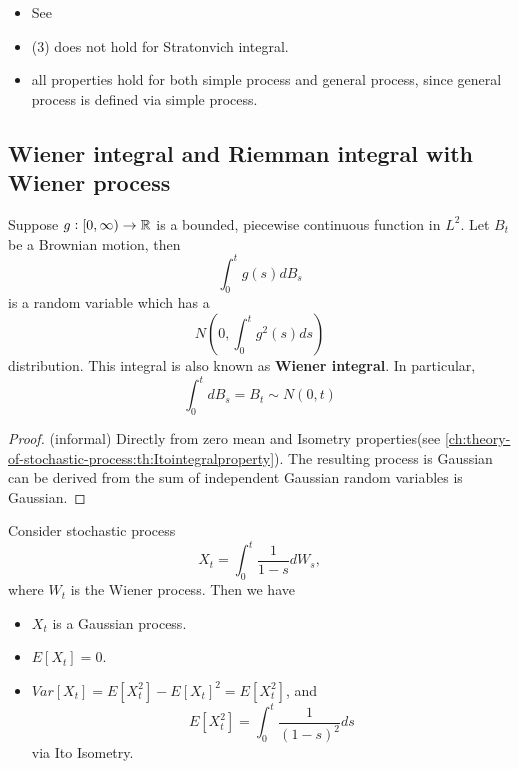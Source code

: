 \begin{refsection}
\begin{theorem}
\begin{enumerate}
	\end{enumerate}
\end{theorem}

\begin{remark}\hfill
	\begin{itemize}
		\item See \cite{Holmes-Cerfon2015applied}\cite{mikosch1998elementary}
		\item (3) does not hold for Stratonvich integral.  
		\item all properties hold for both simple process and general process, since general process is defined via simple process.
	\end{itemize}
\end{remark}




\subsection{Wiener integral and Riemman integral with Wiener process}


\begin{lemma}\cite[112]{calin2012introduction}\label{ch:theory-of-stochastic-process:th:wienerintegral}
	Suppose $g:[0,\infty) \to \mathbb{R}$ is a bounded, piecewise continuous function in $L^2$. Let $B_t$ be a Brownian motion, then
	$$\int_0^t g(s)dB_s$$
	is a random variable which has a 
	$$N(0,\int_0^t g^2(s)ds)$$ 
	distribution. This integral is also known as \textbf{Wiener integral}.
	In particular, 
	$$\int_0^t dB_s = B_t\sim N(0,t) $$
\end{lemma}
\begin{proof}
	(informal)	Directly from zero mean and Isometry properties(see \autoref{ch:theory-of-stochastic-process:th:Itointegralproperty}). The resulting process is Gaussian can be derived from the sum of independent Gaussian random variables is Gaussian.
\end{proof}

\begin{example}
	Consider stochastic process $$X_t = \int_0^t \frac{1}{1-s}dW_s,$$
	where $W_t$ is the Wiener process.
	Then we have
	\begin{itemize}
		\item $X_t$ is a Gaussian process.
		\item $E[X_t] = 0$.
		\item $Var[X_t] = E[X_t^2] - E[X_t]^2 = E[X_t^2]$, and
		$$E[X_t^2] = \int_0^t \frac{1}{(1-s)^2}ds$$
		via Ito Isometry.
	\end{itemize}
\end{example}




\end{refsection}

